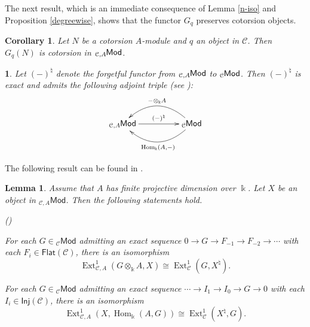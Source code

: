 \documentclass{amsart}
\theoremstyle{bfupright head,slanted body}
\theoremstyle{bfupright head,upright body}
\theoremstyle{fixed bf head,slanted body}
\newtheorem{cor}[res]{Corollary}        \newtheorem*{cor*}{Corollary}
\newtheorem{lem}[res]{Lemma}            \newtheorem*{lem*}{Lemma}
\theoremstyle{fixed bf head,upright body}
\theoremstyle{numbered paragraph}
\newtheorem{ipg}[res]{}
\newlength{\thmlistleft}        %
\newlength{\thmlistright}       %
\newlength{\thmlistpartopsep}   %
\newlength{\thmlisttopsep}      %
\newlength{\thmlistparsep}      %
\newlength{\thmlistitemsep}     %
\newcounter{prt}
\newenvironment{prt}{\begin{list}{\upshape (\alph{prt})}%
		{\usecounter{prt}%
			\setlength{\leftmargin}{\thmlistleft}%
			\setlength{\labelwidth}{\thmlistleft}%
			\setlength{\rightmargin}{\thmlistright}%
			\setlength{\partopsep}{\thmlistpartopsep}%
			\setlength{\topsep}{\thmlisttopsep}%
			\setlength{\parsep}{\thmlistparsep}%
			\setlength{\itemsep}{\thmlistitemsep}}}%
	{\end{list}}%
\numberwithin{equation}{res}
\newcommand{\Flat}[1]{\mathsf{Flat}(#1)}
\newcommand{\Mod}[1]{{_{#1}\mathsf{Mod}}}
\newcommand{\Inj}[1]{\mathsf{Inj}(#1)}
\newcommand{\Hom}[3][]{\operatorname{Hom}_{#1}(#2,#3)}
\newcommand{\Ext}[4][]{\operatorname{Ext}_{#1}^{#2}(#3,#4)}
\newcommand{\C}{\mathcal{C}}
\newcommand{\kk}{\Bbbk}
\newcommand{\is}{\cong}
\newcommand{\lMod}[1]{{}_{#1}\mspace{-1mu}{\sf{Mod}}}
\begin{document}
The next result, which is an immediate consequence of Lemma \ref{n-iso} and Proposition \ref{degreewise}, shows that the functor $G_q$ preserves cotorsion objects.

\begin{cor}\label{cot}
Let $N$ be a cotorsion $A$-module and $q$ an object in $\C$. Then $G_{q}(N)$ is  cotorsion in $\lMod{\C,A}$.
\end{cor}

\begin{ipg}
Let $(-)^{\natural}$ denote the forgetful functor from $\lMod{\C,A}$ to $\lMod{\C}$. Then $(-)^{\natural}$ is exact and admits the following adjoint triple (see \cite[Corollary 3.5]{HJ21}):
  \begin{equation*}
  \xymatrix@C=4pc{
    \lMod{\C,A}
    \ar[r]^-{(-)^{\natural}}
    &
    \lMod{\C}
    \ar@/_1.8pc/[l]_-{-\otimes_{\kk}A}
    \ar@/^1.8pc/[l]^-{\Hom[\kk]{A}{-}}
  }
  \end{equation*}
\end{ipg}

The following result can be found in \cite[Lemma 1.14]{DLLM}.

\begin{lem}\label{iso}
Assume that $A$ has finite projective dimension over $\kk$. Let $X$ be an object in $\Mod{\C,A}$. Then the following statements hold.
\begin{prt}
\item For each $G \in \Mod{\C}$ admitting an exact sequence $0 \to G \to F_{-1} \to F_{-2} \to \cdots$ with each $F_i \in \Flat{\C}$, there is an isomorphism
\[
\Ext[\C,A]{1}{G \otimes_\kk A}{X} \is \Ext[\C]{1}{G}{X^{\natural}}.
\]
\item For each $G \in \Mod{\C}$ admitting an exact sequence $\cdots \to I_1 \to I_0 \to G \to 0$ with each $I_i \in \Inj{\C}$, there is an isomorphism
\[
\Ext[\C,A]{1}{X}{\Hom[\kk]{A}{G}} \is \Ext[\C]{1}{X^{\natural}}{G}.
\]
\end{prt}
\end{lem}
\end{document}
